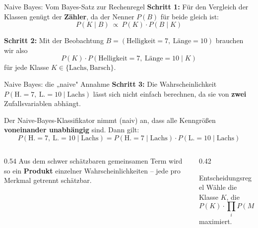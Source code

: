 \begin{frame}{Naive Bayes: Vom Bayes-Satz zur Rechenregel}
\textbf{Schritt 1:} Für den Vergleich der Klassen genügt der
\textbf{Zähler}, da der Nenner $P(B)$ für beide gleich ist:
\[
  P(K \mid B) \ \propto\ P(K)\cdot P(B \mid K)
\]

\vspace{0.6em}
\textbf{Schritt 2:} Mit der Beobachtung
$B = (\text{Helligkeit}=7,\ \text{Länge}=10)$ brauchen wir also
\[
  P(K)\cdot P(\text{Helligkeit}=7,\ \text{Länge}=10 \mid K)
\]
für jede Klasse $K \in \{\text{Lachs}, \text{Barsch}\}$.
\end{frame}

\begin{frame}{Naive Bayes: die „naive" Annahme}
  \small
\textbf{Schritt 3:} Die Wahrscheinlichkeit
$P(\text{H.}=7,\ \text{L.}=10 \mid \text{Lachs})$ lässt sich nicht einfach
berechnen, da sie von \textbf{zwei} Zufallsvariablen abhängt.

\vspace{0.4em}
Der Naive-Bayes-Klassifikator nimmt (naiv) an, dass alle Kenngrößen
\textbf{voneinander unabhängig} sind. Dann gilt:
\[
  P(\text{H.}{=}7,\ \text{L.}{=}10 \mid \text{Lachs}) =
  P(\text{H.}{=}7 \mid \text{Lachs})\cdot P(\text{L.}{=}10 \mid \text{Lachs})
\]

\vspace{0.4em}
\begin{columns}[T,onlytextwidth]
\begin{column}{0.54\textwidth}
Aus dem schwer schätzbaren gemeinsamen Term wird so ein \textbf{Produkt}
einzelner Wahrscheinlichkeiten -- jede pro Merkmal getrennt schätzbar.
\end{column}

\begin{column}{0.42\textwidth}
\begin{blockC1}{\small Entscheidungsregel}
Wähle die Klasse $K$, die
\[
  P(K)\cdot \prod_i P(M_i \mid K)
\]
maximiert.
\end{blockC1}
\end{column}
\end{columns}
\end{frame}


